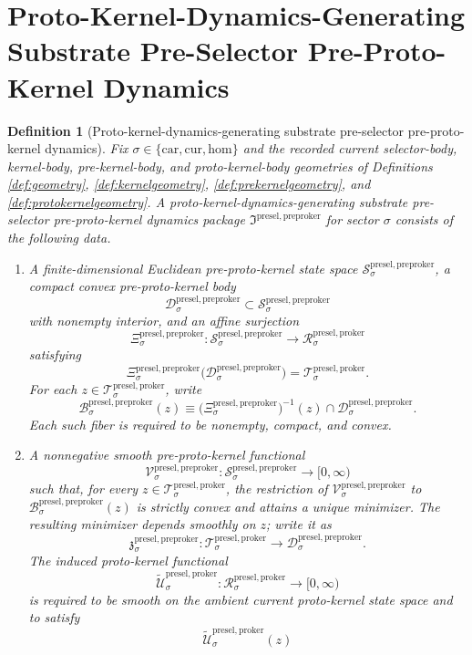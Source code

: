 \documentclass[11pt]{article}
\newcommand{\Car}{\mathrm{car}}
\newcommand{\Cur}{\mathrm{cur}}
\newcommand{\Hom}{\mathrm{hom}}
\newcommand{\ProtoKernelSpace}[1]{\mathcal R_{#1}^{\mathrm{presel,proker}}}
\newcommand{\ProtoKernelBody}[1]{\mathcal T_{#1}^{\mathrm{presel,proker}}}
\newcommand{\PreProtoKernelPackage}{\mathfrak I^{\mathrm{presel,preproker}}}
\newcommand{\PreProtoKernelSpace}[1]{\mathcal S_{#1}^{\mathrm{presel,preproker}}}
\newcommand{\PreProtoKernelBody}[1]{\mathcal D_{#1}^{\mathrm{presel,preproker}}}
\newcommand{\PreProtoKernelProj}[1]{\Xi_{#1}^{\mathrm{presel,preproker}}}
\newcommand{\PreProtoKernelFiber}[2]{\mathcal B_{#1}^{\mathrm{presel,preproker}}(#2)}
\newcommand{\PreProtoKernelFunctional}[1]{\mathscr V_{#1}^{\mathrm{presel,preproker}}}
\newcommand{\PreProtoKernelMinLift}[1]{\mathfrak z_{#1}^{\mathrm{presel,preproker}}}
\newcommand{\InducedProtoKernelFunctional}[1]{\widetilde{\mathscr U}_{#1}^{\mathrm{presel,proker}}}
\newtheorem{definition}{Definition}
\begin{document}
\section{Proto-Kernel-Dynamics-Generating Substrate Pre-Selector Pre-Proto-Kernel Dynamics}

\begin{definition}[Proto-kernel-dynamics-generating substrate pre-selector pre-proto-kernel dynamics]
\label{def:preprotokernel}
Fix \(\sigma\in\{\Car,\Cur,\Hom\}\) and the recorded current selector-body, kernel-body, pre-kernel-body, and proto-kernel-body geometries of Definitions \ref{def:geometry}, \ref{def:kernelgeometry}, \ref{def:prekernelgeometry}, and \ref{def:protokernelgeometry}. A \emph{proto-kernel-dynamics-generating substrate pre-selector pre-proto-kernel dynamics package} \(\PreProtoKernelPackage\) for sector \(\sigma\) consists of the following data.
\begin{enumerate}
    \item A finite-dimensional Euclidean pre-proto-kernel state space \(\PreProtoKernelSpace{\sigma}\), a compact convex pre-proto-kernel body
    \[
    \PreProtoKernelBody{\sigma}\subset\PreProtoKernelSpace{\sigma}
    \]
    with nonempty interior, and an affine surjection
    \[
    \PreProtoKernelProj{\sigma}:\PreProtoKernelSpace{\sigma}\to\ProtoKernelSpace{\sigma}
    \]
    satisfying
    \[
    \PreProtoKernelProj{\sigma}\bigl(\PreProtoKernelBody{\sigma}\bigr)
    =
    \ProtoKernelBody{\sigma}.
    \]
    For each \(z\in\ProtoKernelBody{\sigma}\), write
    \[
    \PreProtoKernelFiber{\sigma}{z}
    \equiv
    \bigl(\PreProtoKernelProj{\sigma}\bigr)^{-1}(z)\cap\PreProtoKernelBody{\sigma}.
    \]
    Each such fiber is required to be nonempty, compact, and convex.
    \item A nonnegative smooth pre-proto-kernel functional
    \[
    \PreProtoKernelFunctional{\sigma}:\PreProtoKernelSpace{\sigma}\to[0,\infty)
    \]
    such that, for every \(z\in\ProtoKernelBody{\sigma}\), the restriction of \(\PreProtoKernelFunctional{\sigma}\) to \(\PreProtoKernelFiber{\sigma}{z}\) is strictly convex and attains a unique minimizer. The resulting minimizer depends smoothly on \(z\); write it as
    \[
    \PreProtoKernelMinLift{\sigma}:\ProtoKernelBody{\sigma}\to\PreProtoKernelBody{\sigma}.
    \]
    The induced proto-kernel functional
    \[
    \InducedProtoKernelFunctional{\sigma}:\ProtoKernelSpace{\sigma}\to[0,\infty)
    \]
    is required to be smooth on the ambient current proto-kernel state space and to satisfy
    \[
    \InducedProtoKernelFunctional{\sigma}(z)
\]
\end{enumerate}
\end{definition}
\end{document}
